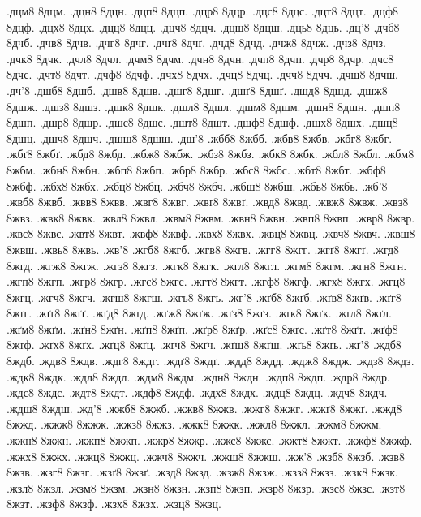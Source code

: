 {.дцм8
8дцм.
.дцн8
8дцн.
.дцп8
8дцп.
.дцр8
8дцр.
.дцс8
8дцс.
.дцт8
8дцт.
.дцф8
8дцф.
.дцх8
8дцх.
.дцц8
8дцц.
.дцч8
8дцч.
.дцш8
8дцш.
.дць8
8дць.
.дц'8
.дчб8
8дчб.
.дчв8
8дчв.
.дчг8
8дчг.
.дчґ8
8дчґ.
.дчд8
8дчд.
.дчж8
8дчж.
.дчз8
8дчз.
.дчк8
8дчк.
.дчл8
8дчл.
.дчм8
8дчм.
.дчн8
8дчн.
.дчп8
8дчп.
.дчр8
8дчр.
.дчс8
8дчс.
.дчт8
8дчт.
.дчф8
8дчф.
.дчх8
8дчх.
.дчц8
8дчц.
.дчч8
8дчч.
.дчш8
8дчш.
.дч'8
.дшб8
8дшб.
.дшв8
8дшв.
.дшг8
8дшг.
.дшґ8
8дшґ.
.дшд8
8дшд.
.дшж8
8дшж.
.дшз8
8дшз.
.дшк8
8дшк.
.дшл8
8дшл.
.дшм8
8дшм.
.дшн8
8дшн.
.дшп8
8дшп.
.дшр8
8дшр.
.дшс8
8дшс.
.дшт8
8дшт.
.дшф8
8дшф.
.дшх8
8дшх.
.дшц8
8дшц.
.дшч8
8дшч.
.дшш8
8дшш.
.дш'8
.жбб8
8жбб.
.жбв8
8жбв.
.жбг8
8жбг.
.жбґ8
8жбґ.
.жбд8
8жбд.
.жбж8
8жбж.
.жбз8
8жбз.
.жбк8
8жбк.
.жбл8
8жбл.
.жбм8
8жбм.
.жбн8
8жбн.
.жбп8
8жбп.
.жбр8
8жбр.
.жбс8
8жбс.
.жбт8
8жбт.
.жбф8
8жбф.
.жбх8
8жбх.
.жбц8
8жбц.
.жбч8
8жбч.
.жбш8
8жбш.
.жбь8
8жбь.
.жб'8
.жвб8
8жвб.
.жвв8
8жвв.
.жвг8
8жвг.
.жвґ8
8жвґ.
.жвд8
8жвд.
.жвж8
8жвж.
.жвз8
8жвз.
.жвк8
8жвк.
.жвл8
8жвл.
.жвм8
8жвм.
.жвн8
8жвн.
.жвп8
8жвп.
.жвр8
8жвр.
.жвс8
8жвс.
.жвт8
8жвт.
.жвф8
8жвф.
.жвх8
8жвх.
.жвц8
8жвц.
.жвч8
8жвч.
.жвш8
8жвш.
.жвь8
8жвь.
.жв'8
.жгб8
8жгб.
.жгв8
8жгв.
.жгг8
8жгг.
.жгґ8
8жгґ.
.жгд8
8жгд.
.жгж8
8жгж.
.жгз8
8жгз.
.жгк8
8жгк.
.жгл8
8жгл.
.жгм8
8жгм.
.жгн8
8жгн.
.жгп8
8жгп.
.жгр8
8жгр.
.жгс8
8жгс.
.жгт8
8жгт.
.жгф8
8жгф.
.жгх8
8жгх.
.жгц8
8жгц.
.жгч8
8жгч.
.жгш8
8жгш.
.жгь8
8жгь.
.жг'8
.жґб8
8жґб.
.жґв8
8жґв.
.жґг8
8жґг.
.жґґ8
8жґґ.
.жґд8
8жґд.
.жґж8
8жґж.
.жґз8
8жґз.
.жґк8
8жґк.
.жґл8
8жґл.
.жґм8
8жґм.
.жґн8
8жґн.
.жґп8
8жґп.
.жґр8
8жґр.
.жґс8
8жґс.
.жґт8
8жґт.
.жґф8
8жґф.
.жґх8
8жґх.
.жґц8
8жґц.
.жґч8
8жґч.
.жґш8
8жґш.
.жґь8
8жґь.
.жґ'8
.ждб8
8ждб.
.ждв8
8ждв.
.ждг8
8ждг.
.ждґ8
8ждґ.
.ждд8
8ждд.
.ждж8
8ждж.
.ждз8
8ждз.
.ждк8
8ждк.
.ждл8
8ждл.
.ждм8
8ждм.
.ждн8
8ждн.
.ждп8
8ждп.
.ждр8
8ждр.
.ждс8
8ждс.
.ждт8
8ждт.
.ждф8
8ждф.
.ждх8
8ждх.
.ждц8
8ждц.
.ждч8
8ждч.
.ждш8
8ждш.
.жд'8
.жжб8
8жжб.
.жжв8
8жжв.
.жжг8
8жжг.
.жжґ8
8жжґ.
.жжд8
8жжд.
.жжж8
8жжж.
.жжз8
8жжз.
.жжк8
8жжк.
.жжл8
8жжл.
.жжм8
8жжм.
.жжн8
8жжн.
.жжп8
8жжп.
.жжр8
8жжр.
.жжс8
8жжс.
.жжт8
8жжт.
.жжф8
8жжф.
.жжх8
8жжх.
.жжц8
8жжц.
.жжч8
8жжч.
.жжш8
8жжш.
.жж'8
.жзб8
8жзб.
.жзв8
8жзв.
.жзг8
8жзг.
.жзґ8
8жзґ.
.жзд8
8жзд.
.жзж8
8жзж.
.жзз8
8жзз.
.жзк8
8жзк.
.жзл8
8жзл.
.жзм8
8жзм.
.жзн8
8жзн.
.жзп8
8жзп.
.жзр8
8жзр.
.жзс8
8жзс.
.жзт8
8жзт.
.жзф8
8жзф.
.жзх8
8жзх.
.жзц8
8жзц.
}
